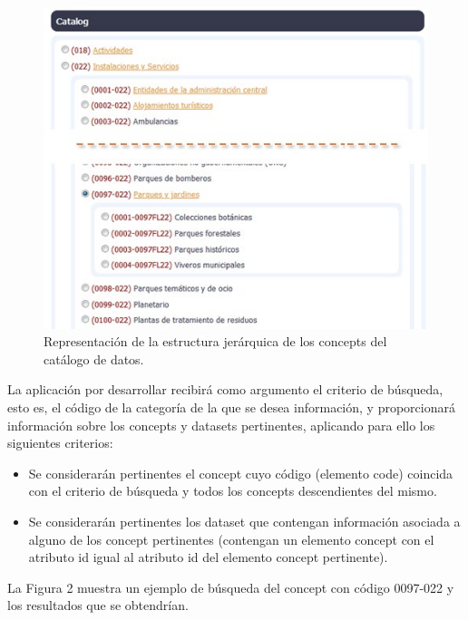 \begin{figure}[H]
\centering
\includegraphics[width=\textwidth]{imagenes/Practica3fig1.jpg}
\caption{\label{fig:Practica3fig1.jpg}Representación de la estructura jerárquica de los concepts del catálogo de datos.}
\end{figure}


La aplicación por desarrollar recibirá como argumento el criterio de búsqueda, esto es, el código de la categoría de la que se desea información, y proporcionará información sobre los concepts y datasets pertinentes, aplicando para ello los siguientes criterios:

\begin{itemize}
    \item Se considerarán pertinentes el concept cuyo código (elemento code) coincida con el criterio de búsqueda y todos los concepts descendientes del mismo.
    \item Se considerarán pertinentes los dataset que contengan información asociada a alguno de los concept pertinentes (contengan un elemento concept con el atributo id igual al atributo id del elemento concept pertinente).
\end{itemize}

La Figura 2 muestra un ejemplo de búsqueda del concept con código 0097-022 y los resultados que se obtendrían.

